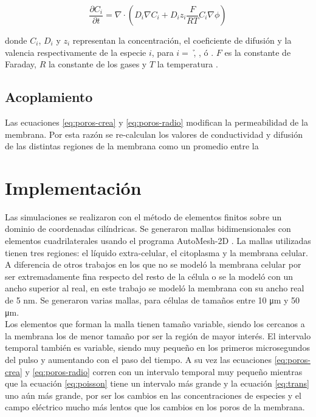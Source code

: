 \documentclass[a4paper,10pt]{article}
\begin{document}
\begin{equation} \label{eq:trans}
	\frac{\partial C_i}{\partial t} = \nabla \cdot \left( D_i \nabla C_i + D_i z_i \frac{F}{R T} C_i \nabla \phi \right)
\end{equation}

donde $C_i$, $D_i$ y $z_i$ representan la concentración, el coeficiente de difusión y la valencia 
respectivamente de la especie $i$, para $i = $ \h, \oh, \na ó \cl.
$F$ es la constante de Faraday, $R$ la constante de los gases y $T$ la temperatura \cite{fodava}.\\

\subsection{Acoplamiento}
Las ecuaciones \eqref{eq:poros-crea} y \eqref{eq:poros-radio} modifican la permeabilidad de la membrana. Por esta razón se re-calculan los valores de conductividad y difusión de las distintas regiones de la membrana como un promedio entre la 

\section{Implementación}
Las simulaciones se realizaron con el método de elementos finitos sobre un dominio de coordenadas cilíndricas. Se generaron mallas bidimensionales con elementos cuadrilaterales usando el programa AutoMesh-2D \cite{automesh}. La mallas utilizadas tienen tres regiones: el líquido extra-celular, el citoplasma y la membrana celular. A diferencia de otros trabajos en los que no se modeló la membrana celular por ser extremadamente fina respecto del resto de la célula o se la modeló con un ancho superior al real, en este trabajo se modeló la membrana con su ancho real de 5 \si{\nano\metre}. Se generaron varias mallas, para células de tamaños entre 10 \si{\micro\metre} y 50 \si{\micro\metre}.\\

Los elementos que forman la malla tienen tamaño variable, siendo los cercanos a la membrana los de menor tamaño por ser la región de mayor interés. El intervalo temporal también es variable, siendo muy pequeño en los primeros microsegundos del pulso y aumentando con el paso del tiempo. A su vez las ecuaciones \eqref{eq:poros-crea} y \eqref{eq:poros-radio} corren con un intervalo temporal muy pequeño mientras que la ecuación \eqref{eq:poisson} tiene un intervalo más grande y la ecuación \eqref{eq:trans} uno aún más grande, por ser los cambios en las concentraciones de especies y el campo eléctrico mucho más lentos que los cambios en los poros de la membrana. 
\end{document}
